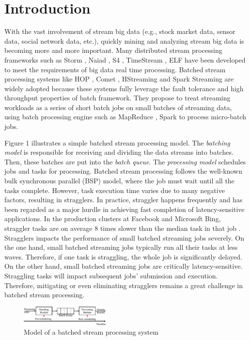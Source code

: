 \documentclass[10pt,conference,compsocconf,letterpaper]{IEEEtran}
\begin{document}
\section{Introduction}

  With the vast involvement of stream big data (e.g., stock market data, sensor data, social network data, etc.), quickly mining and analyzing stream big data is becoming more and more important. Many distributed stream processing frameworks such as Storm \cite{storm-web}, Naiad \cite{Murray2013}, S4 \cite{Neumeyer2010}, TimeStream \cite{Qian2013}, ELF \cite{Hu2014} have been developed to meet the requirements of big data real time processing. Batched stream processing systems like HOP \cite{Condie2010}, Comet \cite{He2010}, HStreaming \cite{HStreaming} and Spark Streaming \cite{Zaharia2013} are widely adopted because these systems fully leverage the fault tolerance and high throughput properties of batch framework\cite{spark-summit}. They propose to treat streaming workloads as a series of short batch jobs on small batches of streaming data, using batch processing engine such as MapReduce \cite{Dean2004}, Spark \cite{Zaharia2010C} to process micro-batch jobs.

  Figure 1 illustrates a simple batched stream processing model. The \emph{batching model} is responsible for receiving and dividing the data streams into batches. Then, these batches are put into the \emph{batch queue}. The \emph{processing model} schedules jobs and tasks for processing. Batched stream processing follows the well-known bulk synchronous parallel (BSP) model, where the job must wait until all the tasks complete. However, task execution time varies due to many negative factors, resulting in stragglers. In practice, straggler happens frequently and has been regarded as a major hurdle in achieving fast completion of latency-sensitive applications. In the production clusters at Facebook and Microsoft Bing, straggler tasks are on average 8 times slower than the median task in that job \cite{Ananthanarayanan2013} \cite{Yadwadkar2014}. Stragglers impacts the performance of small batched streaming jobs severely. On the one hand, small batched streaming jobs typically run all their tasks at less waves. Therefore, if one task is straggling, the whole job is significantly delayed. On the other hand, small batched streaming jobs are critically latency-sensitive. Straggling tasks will impact subsequent jobs' submission and execution. Therefore, mitigating or even eliminating stragglers remains a great challenge in batched stream processing.
  \begin{figure}[htbp]
    \centering
    \includegraphics[width=0.40\textwidth]{FigureModel}
    \caption{Model of a batched stream processing system}\label{Fig. 1:}
  \end{figure}
\end{document}
